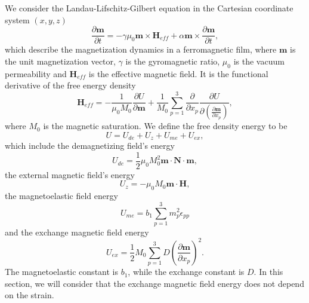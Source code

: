 \documentclass[aps,prl,amsmath,amssymb,preprint,superscriptaddress]{revtex4-1}
\begin{document}
We consider the Landau-Lifschitz-Gilbert equation in the Cartesian coordinate system $\left(x,y,z\right)$
\begin{equation}
    \frac{\partial \mathbf{m}}{\partial t} = - \gamma \mu_0 \mathbf{m} \times \mathbf{H}_{eff} + \alpha \mathbf{m} \times \frac{\partial \mathbf{m}}{\partial t},
    \label{eq:LLG-1}
\end{equation}
which describe the magnetization dynamics in a ferromagnetic film, where $\mathbf{m}$ is the unit magnetization vector, $\gamma$ is the gyromagnetic ratio, $\mu_0$ is the vacuum permeability and $\mathbf{H}_{eff}$ is the effective magnetic field.
It is the functional derivative of the free energy density
\begin{equation}
    \mathbf{H}_{eff} = - \frac{1}{\mu_0 M_0} \frac{\partial U}{\partial \mathbf{m}} + \frac{1}{M_0} \sum_{p=1}^{3} \frac{\partial}{\partial x_p} \frac{\partial U}{\partial \left(\frac{\partial  \mathbf{m}}{\partial x_p} \right)},
    \label{eq:Heff}
\end{equation}
where $M_0$ is the magnetic saturation.
We define the free density energy to be 
\begin{equation}
    U = U_{de} + U_{z} + U_{me} + U_{ex},
    \label{eq:U}
\end{equation}
which include the demagnetizing field's energy
\begin{equation}
    U_{de} = \frac{1}{2} \mu_0 M_0^2 \mathbf{m} \cdot \mathbf{N} \cdot \mathbf{m},
    \label{eq:Ude}
\end{equation}
the external magnetic field's energy
\begin{equation}
    U_z = -\mu_0 M_0 \mathbf{m} \cdot \mathbf{H},
    \label{eq:Uz}
\end{equation}
the magnetoelastic field energy
\begin{equation}
    U_{me} = b_1 \sum_{p=1}^3 m_p^2\epsilon_{pp}
    \label{eq:Ume}
\end{equation}
and the exchange magnetic field energy
\begin{equation}
    U_{ex} = \frac{1}{2} M_0 \sum_{p=1}^3 D \left( \frac{\partial \mathbf{m}}{\partial x_p} \right)^2.
    \label{eq:Uex}
\end{equation}
The magnetoelastic constant is $b_1$, while the exchange constant is $D$.
In this section, we will consider that the exchange magnetic field energy does not depend on the strain.
\end{document}

